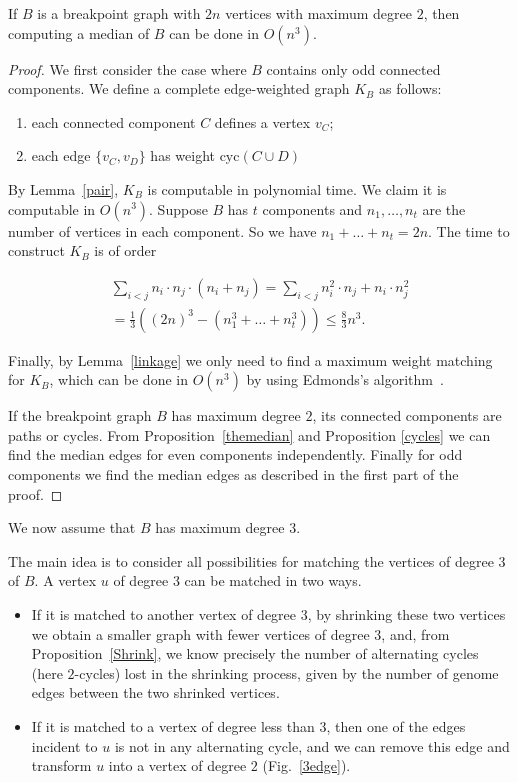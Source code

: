 \documentclass[10pt]{llncs}
\begin{document}
\begin{proposition}\label{odds}
  If $B$ is a breakpoint graph with $2n$ vertices with maximum degree
  $2$, then computing a median of $B$ can be done in $O(n^3)$.
\end{proposition}

\begin{proof}
    We first consider the case where $B$ contains only odd connected
    components. We define a complete edge-weighted graph $K_B$ as
    follows:
   \begin{enumerate}
    \item each connected component $C$ defines a vertex $v_C$;
    \item each edge $\{v_C,v_D\}$ has weight  $\text{cyc}(C \cup D)$
    \end{enumerate}
    By Lemma~\ref{pair}, $K_B$ is computable in polynomial time. We
    claim it is computable in $O(n^3)$.  Suppose $B$ has $t$
    components and $n_1, \ldots, n_t$ are the number of vertices in
    each component. So we have $n_1 + \ldots +n_t = 2n$. The time to
    construct $K_B$ is of order
    
    \begin{align*}
      \sum\limits_{i < j} n_i\cdot n_j\cdot (n_i + n_j)= \sum\limits_{i < j} n_i^2\cdot n_j + n_i\cdot n_j^2 \\ = 
      \frac{1}{3}((2n)^3 - (n_1^3 + \ldots + n_t^3))
\leq \frac{8}{3}n^3.
    \end{align*}
    
    Finally, by Lemma~\ref{linkage} we only need to find a maximum
    weight matching for $K_B$, which can be done in $O(n^{3})$ by
    using Edmonds's algorithm~\cite{Edmonds}.  

    If the breakpoint graph $B$ has maximum degree $2$, its connected
    components are paths or cycles. From Proposition~\ref{themedian}
    and Proposition \ref{cycles} we can find the median edges for even
    components independently. Finally for odd components we find the
    median edges as described in the first part of the proof. \end{proof}
    



  We now assume that
$B$ has maximum degree $3$.  

The main idea is to consider all possibilities for matching the
vertices of degree $3$ of $B$. A vertex $u$ of degree $3$ can be matched
in two ways.
\begin{itemize}
\item If it is matched to another vertex of degree $3$, by shrinking
  these two vertices we obtain a smaller graph with fewer vertices of
  degree $3$, and, from Proposition~\ref{Shrink}, we know precisely
  the number of alternating cycles (here $2$-cycles) lost in the
  shrinking process, given by the number of genome edges between the
  two shrinked vertices.
\item If it is matched to a vertex of degree less than 3, then one of
  the edges incident to $u$ is not in any alternating cycle, and we
  can remove this edge and transform $u$ into a vertex of degree $2$
  (Fig.~\ref{3edge}).
\end{itemize}
\end{document}
